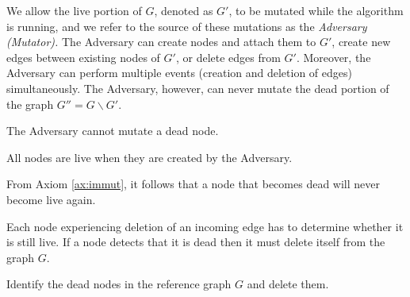 We allow the live portion
of $G$, denoted as $G'$, to be mutated while the algorithm is running, and we refer
to the source of these mutations as the {\em Adversary (Mutator).}
The Adversary can create nodes and attach them to $G'$, create new edges between existing nodes of $G'$, or delete edges from $G'$. Moreover, the Adversary can perform multiple events (creation and deletion of edges)
simultaneously. The Adversary, however, can never mutate the dead portion of the graph $G'' = G\backslash G'$.

\begin{axiom}
	The Adversary cannot mutate a dead node.
	\label{ax:immut}
\end{axiom}

\begin{axiom}
	All nodes are live when they are created by the Adversary.
\end{axiom}

From Axiom \ref{ax:immut}, it follows that a node that becomes dead will never
become live again.

Each node experiencing deletion of an incoming edge has to determine whether it is still
live. If a node detects that it is dead then it must delete itself from the
graph $G$. %

\begin{definition}
	Identify the dead nodes in the reference graph $G$ and delete them.
\end{definition}

